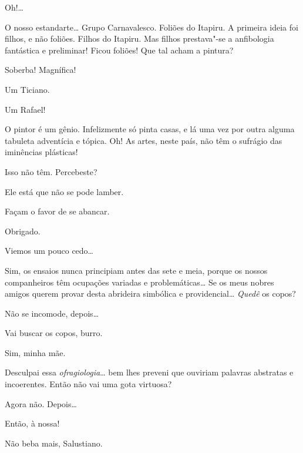   
Oh!\ldots{}

 O nosso
estandarte\ldots{}  Grupo
Carnavalesco. Foliões do Itapiru. A primeira ideia foi
filhos, e não foliões. Filhos do Itapiru. Mas filhos
prestava"-se a anfibologia fantástica e preliminar!
Ficou foliões! Que tal acham a pintura?

 Soberba! Magnífica!

 Um Ticiano.

 Um Rafael!

 O pintor é um
gênio. Infelizmente só pinta casas, e lá uma vez por outra
alguma tabuleta adventícia e tópica.  Oh! As artes, neste
país, não têm o sufrágio das iminências
plásticas!

 Isso não
têm.  Percebeste?

 
Ele está que não se pode lamber.

 
Façam o favor de se abancar.

 Obrigado. 

 Viemos um pouco cedo\ldots{}

 Sim, os ensaios
nunca principiam antes das sete e meia, porque os nossos companheiros
têm ocupações variadas e problemáticas\ldots{} 
Se os meus nobres amigos querem provar desta abrideira
simbólica e providencial\ldots{}  \textit{Quedê} os copos?

 Não se incomode, depois\ldots{}

 Vai buscar os
copos, burro.

 Sim, minha
mãe. 

 Desculpai essa
\textit{ofragiologia}\ldots{} bem lhes preveni que ouviriam
palavras abstratas e incoerentes. 
Então não vai uma gota virtuosa?

 Agora não. Depois\ldots{}

 Então, à nossa!

 Não beba mais,
Salustiano.

